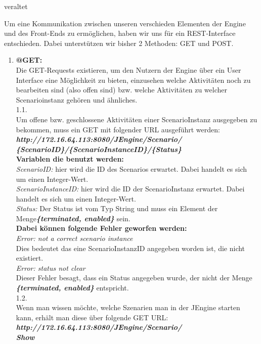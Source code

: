 veraltet

\iffalse
Um eine Kommunikation zwischen unseren verschieden Elementen der Engine und des Front-Ends zu ermöglichen, haben wir uns für ein REST-Interface entschieden. Dabei unterstützen wir bisher 2 Methoden: GET und POST.
\begin{enumerate}
\item \textbf{@GET:}\\
Die GET-Requests existieren, um den Nutzern der Engine über ein User Interface eine Möglichkeit zu bieten, einzusehen welche Aktivitäten noch zu bearbeiten sind (also offen sind) bzw. welche Aktivitäten zu welcher Scenarioinstanz gehören und ähnliches. \\

1.1.\\ Um offene bzw. geschlossene Aktivitäten einer ScenarioInstanz ausgegeben zu bekommen, muss ein GET mit folgender URL ausgeführt werden:\\
\textbf{\textit{http://172.16.64.113:8080/JEngine/Scenario/\\\{ScenarioID\}/\{ScenarioInstanceID\}/\{Status\}}}\\

\textbf{Variablen die benutzt werden:}\\
\textit{ScenarioID:} hier wird die ID des Scenarios erwartet. Dabei handelt es sich um einen Integer-Wert.\\
\textit{ScenarioInstanceID:} hier wird die ID der ScenarioInstanz erwartet. Dabei handelt es sich um einen Integer-Wert.\\
\textit{Status:} Der Status ist vom Typ String und muss ein Element der Menge\textbf{\textit{\{terminated, enabled\}}} sein.\\

\textbf{Dabei können folgende Fehler geworfen werden:}\\
\textit{Error: not a correct scenario instance}\\ Dies bedeutet das eine ScenarioInstanzID angegeben worden ist, die nicht existiert.\\
\textit{Error: status not clear}\\ Dieser Fehler besagt, dass ein Status angegeben wurde, der nicht der Menge \textbf{\textit{\{terminated, enabled\}}} entspricht.\\

1.2. \\Wenn man wissen möchte, welche Szenarien man in der JEngine starten kann, erhält man diese über folgende GET URL:\\
\textbf{\textit{http://172.16.64.113:8080/JEngine/Scenario/\\Show}}\\


\end{enumerate}
